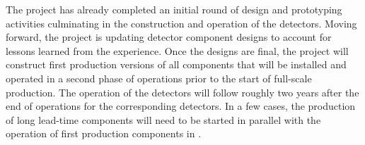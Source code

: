 The  project has already completed an initial round of design 
and prototyping activities culminating in the construction and operation 
of the  detectors.  Moving forward, the project is 
updating detector component designs to account for lessons learned from 
the  experience. Once the designs are final, the 
project will construct first production versions of all components that 
will be installed and operated in a second phase of  
operations prior to the start of full-scale production.  The operation 
of the  detectors will follow roughly two years after
the end of operations for the corresponding  detectors.
In a few cases, the production of long lead-time components will need to 
be started in parallel with the operation of first production components 
in .
